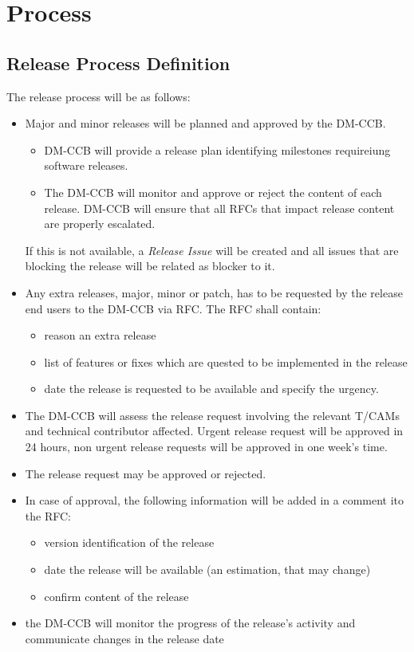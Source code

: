 \section{Process} \label{sec:process}

\subsection{Release Process Definition}

The release process will be as follows:

\begin{itemize}
\item Major and minor releases will be planned and approved by the DM-CCB.
\begin{itemize}
  \item  DM-CCB will provide  a release plan identifying  milestones requireiung software releases.
  \item The DM-CCB will monitor and approve or reject the content of each release. DM-CCB will ensure that  all RFCs that impact  release content are properly escalated.
\end{itemize}
If this is not available, a \textit{Release Issue} will be created and all issues that are blocking the release will be related as blocker to it.
\item Any extra releases, major, minor or patch, has to be requested by the release end users to the DM-CCB via RFC. The RFC shall contain:
\begin{itemize}
  \item reason an extra release
  \item list of features or fixes which are quested to be implemented in the release
  \item date the release is requested to be available and specify the urgency.
\end{itemize}
\item The DM-CCB will assess the release request involving the relevant T/CAMs and technical contributor affected.
Urgent release request will be approved in 24 hours, non urgent release requests will be approved in one week's time.
\item The release request may be approved or rejected.
\item In case of approval, the following information will be added in a comment ito the RFC:
\begin{itemize}
  \item version identification of the release
  \item date the release will be available (an estimation, that may change)
  \item confirm content of the release
\end{itemize}
\item the DM-CCB will monitor the progress of the release's activity and communicate changes in the release date
\end{itemize}


